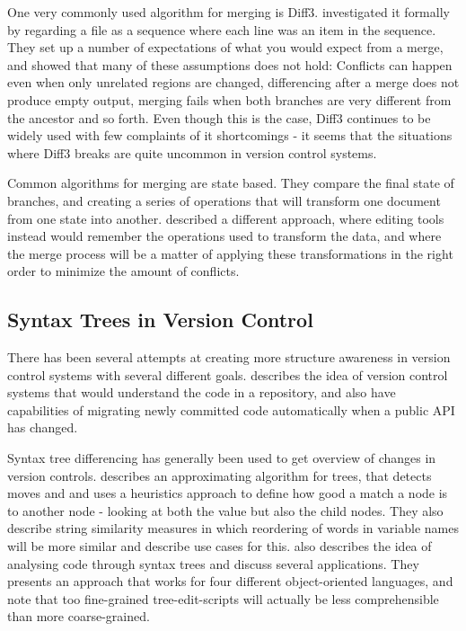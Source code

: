\documentclass[11pt]{article}
\begin{document}
One very commonly used algorithm for merging is Diff3. \citet{Khanna} investigated it formally by regarding a file as a sequence where each line was an item in the sequence. They set up a number of expectations of what you would expect from a merge, and showed that many of these assumptions does not hold: Conflicts can happen even when only unrelated regions are changed, differencing after a merge does not produce empty output, merging fails when both branches are very different from the ancestor and so forth. Even though this is the case, Diff3 continues to be widely used with few complaints of it shortcomings - it seems that the situations where Diff3 breaks are quite uncommon in version control systems.

Common algorithms for merging are state based. They compare the final state of branches, and creating a series of operations that will transform one document from one state into another. \citet{Lippe} described a different approach, where editing tools instead would remember the operations used to transform the data, and where the merge process will be a matter of applying these transformations in the right order to minimize the amount of conflicts.

\subsection{Syntax Trees in Version Control}
There has been several attempts at creating more structure awareness in version control systems with several different goals. \citet{Freese} describes the idea of version control systems that would understand the code in a repository, and also have capabilities of migrating newly committed code automatically when a public API has changed.

Syntax tree differencing has generally been used to get overview of changes in version controls. \citet{Fluri} describes an approximating algorithm for trees, that  detects moves and and uses a heuristics approach to define how good a match a node is to another node - looking at both the value but also the child nodes. They also describe string similarity measures in which reordering of words in variable names will be more similar and describe use cases for this. \citet{Hashimoto} also describes the idea of analysing code through syntax trees and discuss several applications. They presents an approach that works for four different object-oriented languages, and note that too fine-grained tree-edit-scripts will actually be less comprehensible than more coarse-grained.
\end{document}
